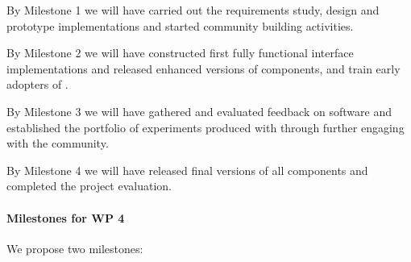\begin{milestones}
  {By Milestone 1 we will have carried out the requirements study, design and prototype implementations and started community building activities.}

  {By Milestone 2 we will have constructed first fully functional interface implementations and released enhanced versions of \TheProject components, and train early adopters of \TheProject.}

  {By Milestone 3 we will have gathered and evaluated feedback on \TheProject software and established the portfolio of experiments produced with \TheProject through further engaging with the community.}

  {By Milestone 4 we will have released final versions of all \TheProject components and completed the project evaluation.}
\end{milestones}

\paragraph{Milestones for WP 4}
We propose two milestones:

